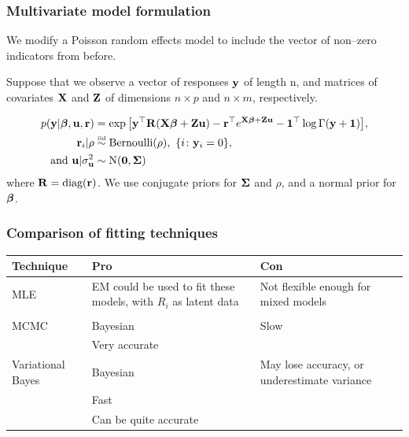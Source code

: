 \documentclass{beamer}
\begin{document}
\begin{frame}
	\frametitle{Multivariate model formulation}
	We modify a Poisson random effects model to include the vector of non--zero indicators from
	before.
							
	\medskip
							
	Suppose that we observe a vector of responses ${\bf y}$ of length n, and matrices
	of covariates ${\bf X}$ and ${\bf Z}$ of dimensions $n \times p$ and $n \times m$,
	respectively.	

	\begin{align*}
		p({\bf y}|{\boldsymbol \beta}, {\bf u}, {\bf r})       & = \exp{\left[{\bf y}^\top {\bf R}({\bf X}{\boldsymbol\beta}+ {\bf Z}{\bf u}) - {\bf r}^\top e^{{\bf X}{\boldsymbol\beta}+ {\bf Z}{\bf u}} - {\bf1}^\top \log{\Gamma({\bf y}+ {\bf1})}\right]}, \\
		{\bf r}_i|\rho                    & \stackrel{\mbox{\tiny iid}}{\sim} \text{Bernoulli}(\rho), \ \{i \colon {\bf y}_i=0\},                                                   \\
		\text{and }{\bf u}|\sigma_{{\bf u}}^2 & \sim \text{N}({\bf 0}, {\boldsymbol \Sigma})
	\end{align*}
	\noindent where ${\bf R} =\mbox{diag}({\bf r})$.
	We use conjugate priors for ${\boldsymbol \Sigma}$ and $\rho$, and a normal prior for ${\boldsymbol \beta}$.
\end{frame}


\begin{frame}
	\frametitle{Comparison of fitting techniques}
	\begin{tabular}{p{2cm}p{3.5cm}p{4.5cm}}
		Technique         & Pro                                                             & Con                                                 \\
		\hline
		MLE               & EM could be used to fit these models, with $R_i$ as latent data & Not flexible enough for mixed models               \\
		                  &                                                                 &                                                     \\ %
		\hline
		MCMC              & Bayesian                                                        & Slow                                                \\
		                  & Very accurate                                                   &                                                     \\
		\hline
		Variational Bayes & Bayesian                                                        & May lose accuracy, or \mbox{underestimate} variance \\
		                  & Fast                                                            &                                                     \\ %
		                  & Can be quite \mbox{accurate}                                    &                                                     \\
		\hline
	\end{tabular}
							
\end{frame}
\end{document}
